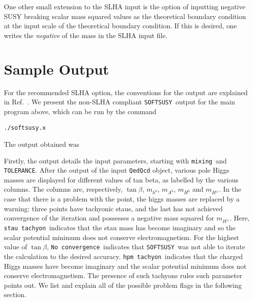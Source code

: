 \documentclass{article}
\def\SOFTSUSY{{\tt SOFTSUSY}}
\def\code#1{\small{\tt #1}\normalsize}
\begin{document}
One other small extension to the SLHA input is the option of inputting
negative SUSY breaking scalar mass squared values as the theoretical boundary
condition at the input scale of the theoretical boundary condition. If this is
desired, one writes the {\em negative} of the mass in the SLHA input file.

\section{Sample Output \label{sec:output}}
For the recommended SLHA option, the conventions for the output are 
explained in Ref.~\cite{lhacc}. 
We present the non-SLHA compliant \SOFTSUSY~output 
for the main program above, which can be run by the command
\small\begin{verbatim} 
./softsusy.x
\end{verbatim}\normalsize
The output obtained was
\small\normalsize

Firstly, the output details the input parameters, starting with
\code{mixing}~and \code{TOLERANCE}.  
After the output of the input \code{QedQcd} object,
various pole Higgs masses are displayed for different values of tan beta, as
labelled by the various columns. The columns are, respectively, 
$\tan \beta$, $m_{h^0}$, $m_{A^0}$, $m_{H^0}$ and $m_{H^\pm}$.
In the case that there is a problem with the point, the higgs masses are
replaced by a warning: three points have tachyonic staus, and the last has
not achieved convergence of the iteration and possesses a negative mass
squared for $m_{H^\pm}$. Here, \code{stau tachyon}~indicates that the
stau mass has become imaginary and so the scalar potential minimum does not 
conserve electromagnetism. For the highest value of $\tan \beta$, \code{No
  convergence}~indicates that \SOFTSUSY~was not able to iterate the
calculation to the desired accuracy. \code{hpm tachyon}~indicates that the
charged Higgs masses have become imaginary and the scalar potential minimum
does not conserve electromagnetism. The presence of such tachyons rules such
parameter points out.  
We list and explain all of the possible problem flags in 
the following section.
\end{document}
